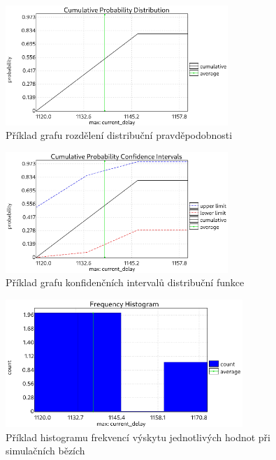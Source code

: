 \begin{figure}[H]
    \centering
    \includegraphics[width=0.75\textwidth]{obrazky-figures/plot_cum_prob_dist.png}
    \caption{Příklad grafu rozdělení distribuční pravděpodobnosti}
    \label{fig:plot_cum_prob_dist}
\end{figure}

\begin{figure}[H]
    \centering
    \includegraphics[width=0.75\textwidth]{obrazky-figures/plot_conf_ints.png}
    \caption{Příklad grafu konfidenčních intervalů distribuční funkce}
    \label{fig:plot_conf_ints}
\end{figure}

\begin{figure}[H]
    \centering
    \includegraphics[width=0.8\textwidth]{obrazky-figures/plot_freq_hist.png}
    \caption{Příklad histogramu frekvencí výskytu jednotlivých hodnot při simulačních bězích}
    \label{fig:plot_freq_hist}
\end{figure}

